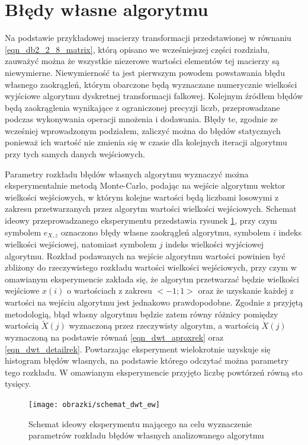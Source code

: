 \section{Błędy własne algorytmu}

Na podstawie przykładowej macierzy transformacji przedstawionej w równaniu \eqref{eqn_db2_2_8_matrix}, którą opisano we wcześniejszej części rozdziału, zauważyć można że wszystkie niezerowe wartości elementów tej macierzy są niewymierne. Niewymierność ta jest pierwszym powodem powstawania błędu własnego zaokrągleń, którym obarczone będą wyznaczane numerycznie wielkości wyjściowe algorytmu dyskretnej transformacji falkowej. Kolejnym źródłem błędów będą zaokrąglenia wynikające z ograniczonej precyzji liczb, przeprowadzane podczas wykonywania operacji mnożenia i dodawania. Błędy te, zgodnie ze wcześniej wprowadzonym podziałem, zaliczyć można do błędów statycznych ponieważ ich wartość nie zmienia się w czasie dla kolejnych iteracji algorytmu przy tych samych danych wejściowych.

Parametry rozkładu błędów własnych algorytmu wyznaczyć można eksperymentalnie metodą Monte-Carlo, podając na wejście algorytmu wektor wielkości wejściowych, w którym kolejne wartości będą liczbami losowymi z zakresu przetwarzanych przez algorytm wartości wielkości wejściowych. Schemat ideowy przeprowadzanego eksperymentu przedstawia rysunek \ref{fig_schemat_dwt_ew}, przy czym symbolem $e_{X,z}$ oznaczono błędy własne zaokrągleń algorytmu, symbolem $i$ indeks wielkości wejściowej, natomiast symbolem $j$ indeks wielkości wyjściowej algorytmu. Rozkład podawanych na wejście algorytmu wartości powinien być zbliżony do rzeczywistego rozkładu wartości wielkości wejściowych, przy czym w omawianym eksperymencie zakłada się, że algorytm przetwarzać będzie wielkości wejściowe $x(i)$ o wartościach z zakresu $<-1;1>$ oraz że uzyskanie każdej z wartości na wejściu algorytmu jest jednakowo prawdopodobne. Zgodnie z przyjętą metodologią, błąd własny algorytmu będzie zatem równy różnicy pomiędzy wartością $\tilde{X}(j)$ wyznaczoną przez rzeczywisty algorytm, a wartością $\dot{X}(j)$ wyznaczoną na podstawie równań \eqref{eqn_dwt_aproxrek} oraz \eqref{eqn_dwt_detailrek}. Powtarzając eksperyment wielokrotnie uzyskuje się histogram błędów własnych, na podstawie którego odczytać można parametry tego rozkładu. W omawianym eksperymencie przyjęto liczbę powtórzeń równą sto tysięcy.

\begin{figure}[htb!]
\begin{center}
\texttt{[image: obrazki/schemat\_dwt\_ew]}
\caption{Schemat ideowy eksperymentu mającego na celu wyznaczenie parametrów rozkładu błędów własnych analizowanego algorytmu \label{fig_schemat_dwt_ew}}
\end{center}
\end{figure}

